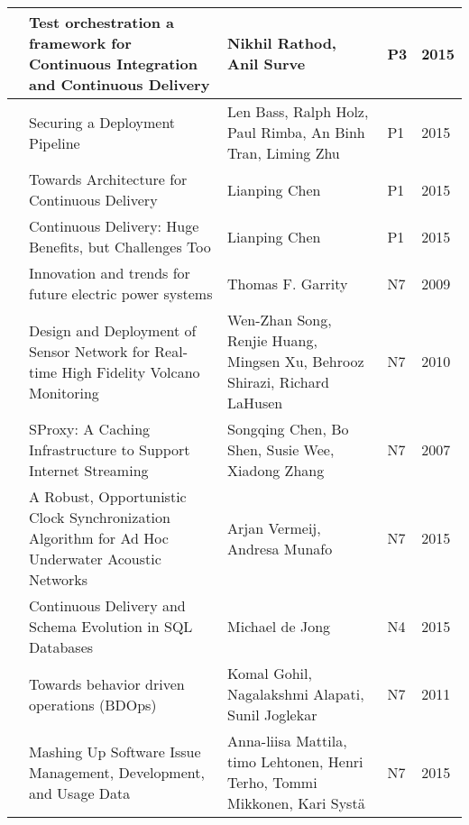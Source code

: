 \begin{landscape}
\begin{longtable}{|l|L{10cm}|L{10cm}|l|l|}
      & Test orchestration a framework for Continuous Integration and Continuous Delivery & Nikhil Rathod, Anil Surve & P3 & 2015\\ \hline
    
     & Securing a Deployment Pipeline & Len Bass, Ralph Holz, Paul Rimba, An Binh Tran, Liming Zhu & P1 & 2015 \\ \hline
    
      & Towards Architecture for Continuous Delivery & Lianping Chen & P1 & 2015\\ \hline
    
      & Continuous Delivery: Huge Benefits, but Challenges Too & Lianping Chen & P1 & 2015 \\ \hline
    
     & Innovation and trends for future electric power systems & Thomas F. Garrity & N7 & 2009 \\ \hline
     
     & Design and Deployment of Sensor Network for Real-time High Fidelity Volcano Monitoring & Wen-Zhan Song, Renjie Huang, Mingsen Xu, Behrooz Shirazi, Richard LaHusen & N7 & 2010 \\ \hline
    
     & SProxy: A Caching Infrastructure to Support Internet Streaming & Songqing Chen, Bo Shen, Susie Wee, Xiadong Zhang & N7 & 2007 \\ \hline
    
     & A Robust, Opportunistic Clock Synchronization Algorithm for Ad Hoc Underwater Acoustic Networks & Arjan Vermeij, Andresa Munafo & N7 & 2015 \\ \hline
    
     & Continuous Delivery and Schema Evolution in SQL Databases & Michael de Jong & N4 & 2015 \\ \hline
    
      & Towards behavior driven operations (BDOps) & Komal Gohil, Nagalakshmi Alapati, Sunil Joglekar & N7 & 2011 \\ \hline
    
     & Mashing Up Software Issue Management, Development, and Usage Data & Anna-liisa Mattila, timo Lehtonen, Henri Terho, Tommi Mikkonen, Kari Systä & N7 & 2015 \\ \hline
    

\end{longtable}
\end{landscape}
